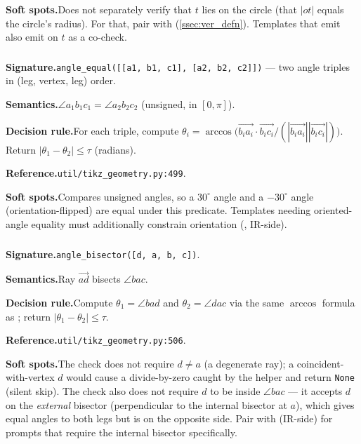 \noindent\textbf{Soft spots.}\quad Does not separately verify that $t$ lies on the circle (that $|ot|$ equals the circle's radius). For that, pair with  (\cref{ssec:ver_defn}).
Templates that emit  also emit  on $t$ as a co-check.

\subsubsection{}
\label{app:pred:angle_equal}

\noindent\textbf{Signature.}\quad \texttt{angle\_equal([[a1, b1, c1], [a2, b2, c2]])} --- two angle triples in (leg, vertex, leg) order.

\noindent\textbf{Semantics.}\quad $\angle a_1 b_1 c_1 = \angle a_2 b_2 c_2$ (unsigned, in $[0, \pi]$).

\noindent\textbf{Decision rule.}\quad For each triple, compute $\theta_i = \arccos\big(\vec{b_i a_i}\cdot\vec{b_i c_i} / (|\vec{b_i a_i}||\vec{b_i c_i}|)\big)$.
Return $|\theta_1 - \theta_2| \leq \tau$ (radians).

\noindent\textbf{Reference.}\quad \texttt{util/tikz\_geometry.py:499}.

\noindent\textbf{Soft spots.}\quad Compares unsigned angles, so a $30^\circ$ angle and a $-30^\circ$ angle (orientation-flipped) are equal under this predicate.
Templates needing oriented-angle equality must additionally constrain orientation (, IR-side).

\subsubsection{}
\label{app:pred:angle_bisector}

\noindent\textbf{Signature.}\quad \texttt{angle\_bisector([d, a, b, c])}.

\noindent\textbf{Semantics.}\quad Ray $\vec{ad}$ bisects $\angle bac$.

\noindent\textbf{Decision rule.}\quad Compute $\theta_1 = \angle bad$ and $\theta_2 = \angle dac$ via the same $\arccos$ formula as ; return $|\theta_1 - \theta_2| \leq \tau$.

\noindent\textbf{Reference.}\quad \texttt{util/tikz\_geometry.py:506}.

\noindent\textbf{Soft spots.}\quad The check does not require $d \neq a$ (a degenerate ray); a coincident-with-vertex $d$ would cause a divide-by-zero caught by the helper and return \texttt{None} (silent skip).
The check also does not require $d$ to be inside $\angle bac$ --- it accepts $d$ on the \emph{external} bisector (perpendicular to the internal bisector at $a$), which gives equal angles to both legs but is on the opposite side.
Pair with  (IR-side) for prompts that require the internal bisector specifically.

